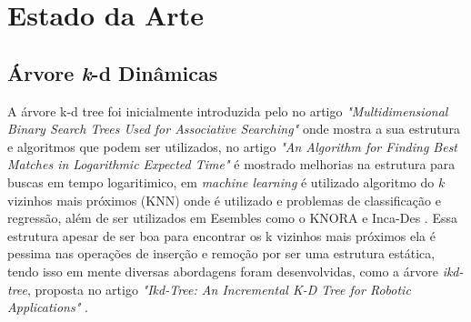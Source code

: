 \chapter{Estado da Arte}

\section{Árvore \textit{k}-d Dinâmicas}

A árvore k-d tree foi inicialmente introduzida pelo \citet{bentleyMultidimensionalBinarySearch1975} no artigo \textit{"Multidimensional Binary Search Trees Used for Associative Searching"} onde mostra a sua estrutura e algoritmos que podem ser utilizados, no artigo \textit{"An Algorithm for Finding Best Matches in Logarithmic Expected Time"} \citep{friedmanAlgorithmFindingBest1977} é mostrado melhorias na estrutura para buscas em tempo logaritimico, em \textit{machine learning} é utilizado algoritmo do $k$ vizinhos mais próximos (KNN) onde é utilizado e problemas de classificação e regressão, além de ser utilizados em Esembles como o KNORA e Inca-Des \citep{koDynamicClassifierSelection2008,limabarbozaIncaDesIncrementalAdaptive2024}. Essa estrutura apesar de ser boa para encontrar os k vizinhos mais próximos ela é pessima nas operações de inserção e remoção por ser uma estrutura estática, tendo isso em mente diversas abordagens foram desenvolvidas, como a árvore \textit{ikd-tree}, proposta no artigo \textit{"Ikd-Tree: An Incremental K-D Tree for Robotic Applications"} \citep{caiIkdTreeIncrementalKD2021}.


